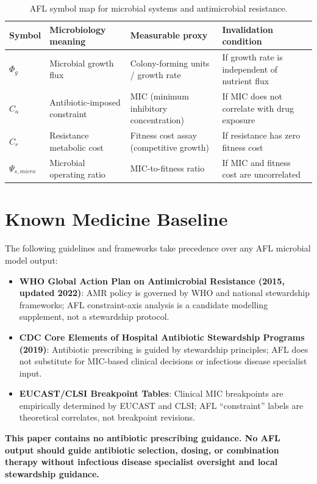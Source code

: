 \documentclass[11pt]{article}
\begin{document}
\begin{table}[h!]
\centering
\caption{AFL symbol map for microbial systems and antimicrobial resistance.}
\begin{tabular}{llll}
\toprule
\textbf{Symbol} & \textbf{Microbiology meaning} & \textbf{Measurable proxy} & \textbf{Invalidation condition} \\
\midrule
$\Phi_g$ & Microbial growth flux & Colony-forming units / growth rate & If growth rate is independent of nutrient flux \\
$C_a$ & Antibiotic-imposed constraint & MIC (minimum inhibitory concentration) & If MIC does not correlate with drug exposure \\
$C_r$ & Resistance metabolic cost & Fitness cost assay (competitive growth) & If resistance has zero fitness cost \\
$\Psi_{s,micro}$ & Microbial operating ratio & MIC-to-fitness ratio & If MIC and fitness cost are uncorrelated \\
\bottomrule
\end{tabular}
\end{table}

\section{Known Medicine Baseline}

The following guidelines and frameworks take precedence over any AFL microbial model output:
\begin{itemize}
  \item \textbf{WHO Global Action Plan on Antimicrobial Resistance (2015, updated 2022)}: AMR policy is governed by WHO and national stewardship frameworks; AFL constraint-axis analysis is a candidate modelling supplement, not a stewardship protocol.
  \item \textbf{CDC Core Elements of Hospital Antibiotic Stewardship Programs (2019)}: Antibiotic prescribing is guided by stewardship principles; AFL does not substitute for MIC-based clinical decisions or infectious disease specialist input.
  \item \textbf{EUCAST/CLSI Breakpoint Tables}: Clinical MIC breakpoints are empirically determined by EUCAST and CLSI; AFL ``constraint'' labels are theoretical correlates, not breakpoint revisions.
\end{itemize}

\textbf{This paper contains no antibiotic prescribing guidance. No AFL output should guide antibiotic selection, dosing, or combination therapy without infectious disease specialist oversight and local stewardship guidance.}
\end{document}
